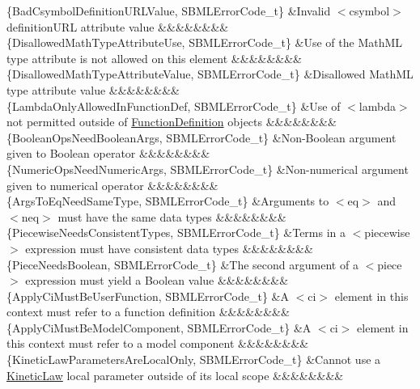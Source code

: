 \begin{DoxyParagraph}{}
\begin{longtabu}
\{Bad\+Csymbol\+Definition\+U\+R\+L\+Value, S\+B\+M\+L\+Error\+Code\+\_\+t\} &Invalid {\ttfamily $<$csymbol$>$} \textquotesingle{}definition\+U\+RL\textquotesingle{} attribute value &&&&&&&&\\
\{Disallowed\+Math\+Type\+Attribute\+Use, S\+B\+M\+L\+Error\+Code\+\_\+t\} &Use of the Math\+ML \textquotesingle{}type\textquotesingle{} attribute is not allowed on this element &&&&&&&&\\
\{Disallowed\+Math\+Type\+Attribute\+Value, S\+B\+M\+L\+Error\+Code\+\_\+t\} &Disallowed Math\+ML \textquotesingle{}type\textquotesingle{} attribute value &&&&&&&&\\
\{Lambda\+Only\+Allowed\+In\+Function\+Def, S\+B\+M\+L\+Error\+Code\+\_\+t\} &Use of {\ttfamily $<$lambda$>$} not permitted outside of \hyperlink{class_function_definition}{Function\+Definition} objects &&&&&&&&\\
\{Boolean\+Ops\+Need\+Boolean\+Args, S\+B\+M\+L\+Error\+Code\+\_\+t\} &Non-\/\+Boolean argument given to Boolean operator &&&&&&&&\\
\{Numeric\+Ops\+Need\+Numeric\+Args, S\+B\+M\+L\+Error\+Code\+\_\+t\} &Non-\/numerical argument given to numerical operator &&&&&&&&\\
\{Args\+To\+Eq\+Need\+Same\+Type, S\+B\+M\+L\+Error\+Code\+\_\+t\} &Arguments to {\ttfamily $<$eq$>$} and {\ttfamily $<$neq$>$} must have the same data types &&&&&&&&\\
\{Piecewise\+Needs\+Consistent\+Types, S\+B\+M\+L\+Error\+Code\+\_\+t\} &Terms in a {\ttfamily $<$piecewise$>$} expression must have consistent data types &&&&&&&&\\
\{Piece\+Needs\+Boolean, S\+B\+M\+L\+Error\+Code\+\_\+t\} &The second argument of a {\ttfamily $<$piece$>$} expression must yield a Boolean value &&&&&&&&\\
\{Apply\+Ci\+Must\+Be\+User\+Function, S\+B\+M\+L\+Error\+Code\+\_\+t\} &A {\ttfamily $<$ci$>$} element in this context must refer to a function definition &&&&&&&&\\
\{Apply\+Ci\+Must\+Be\+Model\+Component, S\+B\+M\+L\+Error\+Code\+\_\+t\} &A {\ttfamily $<$ci$>$} element in this context must refer to a model component &&&&&&&&\\
\{Kinetic\+Law\+Parameters\+Are\+Local\+Only, S\+B\+M\+L\+Error\+Code\+\_\+t\} &Cannot use a \hyperlink{class_kinetic_law}{Kinetic\+Law} local parameter outside of its local scope &&&&&&&&\\

\end{longtabu}
\end{DoxyParagraph}
